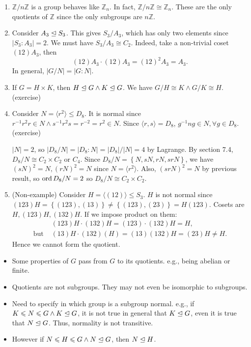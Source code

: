 \documentclass[a4paper]{article}
\newcommand{\bluecomment}[1]{{\color{blue}#1}}
\begin{document}
\begin{example}
  \begin{enumerate}
    \item $ \mathbb{Z}/n\mathbb{Z} $ is a group behaves like $
      \mathbb{Z}_{n} $. In fact, $ \mathbb{Z}/n\mathbb{Z} \cong
      \mathbb{Z}_{n} $. These are the only quotients of $ \mathbb{Z}
      $ since the only subgroups are $ n \mathbb{Z} $.
    \item Consider $ A_3 \trianglelefteq S_3 $. This gives $ S_3/A_3$, which
      has only two elements since $ |S_3:A_3|=2 $. We must have $
      S_3/A_3 \cong C_2 $. Indeed, take a non-trivial coset $ (12) A_3$, then
      \[
        (12)A_3\cdot (12)A_3=(12)^2A_3=A_3
      .\]
      \bluecomment{In general, $ |G/N| =|G:N|$.}
    \item If $ G=H\times K $, then $ H \trianglelefteq G \land K\trianglelefteq G
      $. We have $ G/H \cong K \land G/K \cong H $.(exercise)
    \item Consider $ N=\langle r^2 \rangle \le D_8 $. It is normal
      since $ r^{-1}r^2r\in N \land s^{-1}r^2s=r^{-2}=r^2\in N $.
      Since $ \langle r,s \rangle =D_8 $, $ g^{-1}ng\in N, \forall
      g\in D_8 $.(exercise)

      $ |N|=2 $, so $ |D_8/N|=|D_8:N|=|D_8|/|N|=4 $ by Lagrange. By
      section 7.4, $ D_8/N\cong C_2\times C_2 \text{ or } C_4 $.
      Since $ D_8/N=\left\{ N,sN,rN,srN\right\} $, we have $
      (sN)^2=N, (rN)^2=N $ since $ N=\langle r^2 \rangle $. Also, $
      (srN)^2=N $ by previous result, so $ \operatorname{ord} D_8/N=2 $ so $
      D_8/N\cong C_2 \times C_2 $.
    \item (Non-example) Consider $ H=\langle (12) \rangle \le S_3 $.
      $H$ is not normal since $ (123)H=\left\{ (123),(13)\right\}\neq
      \left\{ (123),(23)\right\}=H(123) $. Cosets are $ H, (123)H,
      (132)H $. If we impose product on them:
      \[
        \begin{aligned}
          &(123)H\cdot (132)H=(123)\cdot (132)H=H,\\
          \text{but } &(13)H\cdot (132)(H)=(13)(132)H=(23)H\neq H.
        \end{aligned}
      \]
      Hence we cannot form the quotient.
  \end{enumerate}
\end{example}
\begin{remark}
  \begin{itemize}
    \item Some properties of $G$ pass from $G$ to its quotients.
      e.g., being abelian or finite.
    \item Quotients are not subgroups. They may not even be
      isomorphic to subgroups.
    \item Need to specify in which group is a subgroup normal. e.g.,
      if $ K\leqslant N\leqslant G \land K \trianglelefteq G $, it is not true in
      general that $ K \trianglelefteq G$, even it is true that $ N\trianglelefteq
      G $. Thus, normality is not transitive.
    \item However if $ N\leqslant H\leqslant G  \land N \trianglelefteq G$, then $ N\trianglelefteq H $.
  \end{itemize}
\end{remark}
\end{document}
